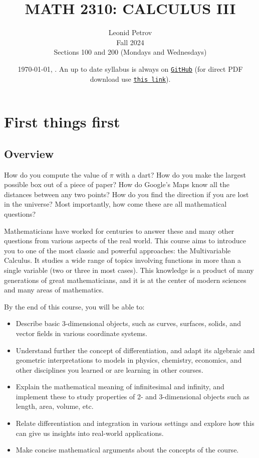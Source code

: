 \documentclass[oneside,11pt]{amsart}
\begin{document}
\title[MATH 2310: CALCULUS III]{MATH 2310: CALCULUS III}
\author{Leonid Petrov\\Fall 2024\\Sections 100 and 200 (Mondays and Wednesdays)}
\date{\today, \currenttime. An up to date syllabus is always on \href{https://github.com/lenis2000/Syllabi/blob/master/Syllabus_2310_f24.pdf}{\texttt{GitHub}} (for direct PDF download use \href{https://github.com/lenis2000/Syllabi/raw/master/Syllabus_2310_f24.pdf}{\texttt{this link}}).}
\maketitle

\setcounter{tocdepth}{3}

\section{First things first}

\subsection{Overview}

How do you compute the value of $\pi$ with a dart? How do you make the largest possible box out of a piece of paper? How do Google's Maps know all the distances between any two points? How do you find the direction if you are lost in the universe? Most importantly, how come these are all mathematical questions?

Mathematicians have worked for centuries to answer these and many other questions from various aspects of the real world. This course aims to introduce you to one of the most classic and powerful approaches: the Multivariable Calculus. It studies a wide range of topics involving functions in more than a single variable (two or three in most cases). This knowledge is a product of many generations of great mathematicians, and it is at the center of modern sciences and many areas of mathematics. 

By the end of this course, you will be able to:
\begin{itemize}
	\item 
	Describe basic 3-dimensional objects, such as curves, surfaces, solids, and vector fields in various coordinate systems.
	\item 
	Understand further the concept of differentiation, and adapt its algebraic and geometric interpretations to models in physics, chemistry, economics, and other disciplines you learned or are learning in other courses.
	\item 
	Explain the mathematical meaning of infinitesimal and infinity, and implement these to study properties of 2- and 3-dimensional objects such as length, area, volume, etc.
	\item 
	Relate differentiation and integration in various settings and explore how this can give us insights into real-world applications.
	\item 
	Make concise mathematical arguments about the concepts of the course.
\end{itemize}
\end{document}
